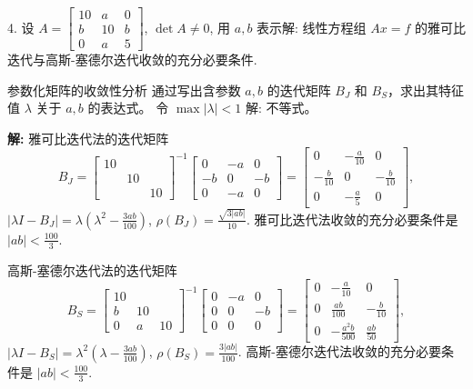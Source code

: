 \documentclass[a4paper,11pt]{ctexart}
\begin{document}
\vspace{2em}

4. 设 $A = \begin{bmatrix} 10 & a & 0 \\ b & 10 & b \\ 0 & a & 5 \end{bmatrix}$, $\det A \neq 0$, 用 $a, b$ 表示解: 线性方程组 $Ax=f$ 的雅可比迭代与高斯-塞德尔迭代收敛的充分必要条件.

\begin{theorybox}{参数化矩阵的收敛性分析}
通过写出含参数 $a, b$ 的迭代矩阵 $B_J$ 和 $B_S$，求出其特征值 $\lambda$ 关于 $a,b$ 的表达式。
令 $\max |\lambda| < 1$ 解: 不等式。
\end{theorybox}

\textbf{解: } 雅可比迭代法的迭代矩阵
\[
B_J = \begin{bmatrix} 10 & & \\ & 10 & \\ & & 10 \end{bmatrix}^{-1}
\begin{bmatrix} 0 & -a & 0 \\ -b & 0 & -b \\ 0 & -a & 0 \end{bmatrix} =
\begin{bmatrix} 0 & -\frac{a}{10} & 0 \\ -\frac{b}{10} & 0 & -\frac{b}{10} \\ 0 & -\frac{a}{5} & 0 \end{bmatrix},
\]
$|\lambda I - B_J| = \lambda \left( \lambda^2 - \frac{3ab}{100} \right)$, $\rho(B_J) = \frac{\sqrt{3|ab|}}{10}$.
雅可比迭代法收敛的充分必要条件是 $|ab| < \frac{100}{3}$.

高斯-塞德尔迭代法的迭代矩阵
\[
B_S = \begin{bmatrix} 10 & & \\ b & 10 & \\ 0 & a & 10 \end{bmatrix}^{-1}
\begin{bmatrix} 0 & -a & 0 \\ 0 & 0 & -b \\ 0 & 0 & 0 \end{bmatrix} =
\begin{bmatrix} 0 & -\frac{a}{10} & 0 \\ 0 & \frac{ab}{100} & -\frac{b}{10} \\ 0 & -\frac{a^2b}{500} & \frac{ab}{50} \end{bmatrix},
\]
$|\lambda I - B_S| = \lambda^2 \left( \lambda - \frac{3ab}{100} \right)$, $\rho(B_S) = \frac{3|ab|}{100}$.
高斯-塞德尔迭代法收敛的充分必要条件是 $|ab| < \frac{100}{3}$.
\end{document}
